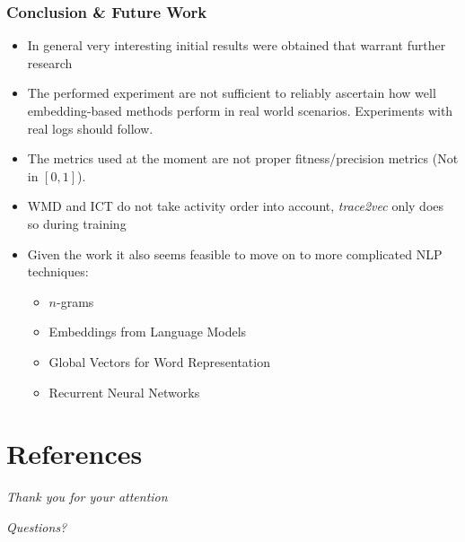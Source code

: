 \documentclass{beamer}
\begin{document}
\begin{frame}
	\frametitle{Conclusion \& Future Work}
	\begin{itemize}
		\item In general very interesting initial results were obtained that warrant further research
		\item The performed experiment are not sufficient to reliably ascertain how well embedding-based methods perform in real world scenarios. Experiments with real logs should follow.
		\item The metrics used at the moment are not proper fitness/precision metrics (Not in $[0,1]$).
		\item WMD and ICT do not take activity order into account, \emph{trace2vec} only does so during training
		\item Given the work it also seems feasible to move on to more complicated NLP techniques:
		\begin{itemize}
			\item $n$-grams
			\item Embeddings from Language Models
			\item Global Vectors for Word Representation
			\item Recurrent Neural Networks
		\end{itemize}
	\end{itemize}
\end{frame}

\section*{References}
\begin{frame}[allowframebreaks]
	
	
\end{frame}

\begin{frame}{}
	\centering \Large
	\emph{Thank you for your attention}
	
	\emph{Questions?}
\end{frame}
	
\end{document}
